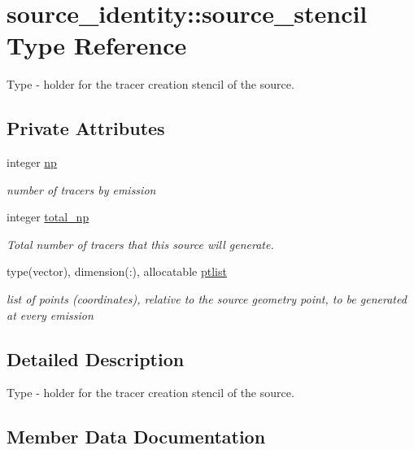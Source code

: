 \hypertarget{structsource__identity_1_1source__stencil}{}\section{source\+\_\+identity\+:\+:source\+\_\+stencil Type Reference}
\label{structsource__identity_1_1source__stencil}


Type -\/ holder for the tracer creation stencil of the source.  


\subsection*{Private Attributes}
\begin{DoxyCompactItemize}
\item 
integer \mbox{\hyperlink{structsource__identity_1_1source__stencil_a2d71d3aefbd9e69874f490ddae97ce64}{np}}
\begin{DoxyCompactList}\small\item\em number of tracers by emission \end{DoxyCompactList}\item 
integer \mbox{\hyperlink{structsource__identity_1_1source__stencil_a11f7462457253157db252466b51000f2}{total\+\_\+np}}
\begin{DoxyCompactList}\small\item\em Total number of tracers that this source will generate. \end{DoxyCompactList}\item 
type(vector), dimension(\+:), allocatable \mbox{\hyperlink{structsource__identity_1_1source__stencil_a91822da10e869f72071fa29e2bb2c080}{ptlist}}
\begin{DoxyCompactList}\small\item\em list of points (coordinates), relative to the source geometry point, to be generated at every emission \end{DoxyCompactList}\end{DoxyCompactItemize}


\subsection{Detailed Description}
Type -\/ holder for the tracer creation stencil of the source. 

\subsection{Member Data Documentation}
\mbox{\label{structsource__identity_1_1source__stencil_a2d71d3aefbd9e69874f490ddae97ce64}} 
